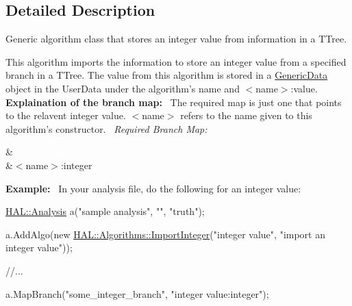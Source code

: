 \subsection{Detailed Description}
Generic algorithm class that stores an integer value from information in a T\+Tree. 

This algorithm imports the information to store an integer value from a specified branch in a T\+Tree. The value from this algorithm is stored in a \hyperlink{class_h_a_l_1_1_generic_data}{Generic\+Data} object in the User\+Data under the algorithm's name and $<$name$>$\+:value.~\newline
~\newline
{\bfseries Explaination of the branch map\+:}~\newline
The required map is just one that points to the relavent integer value. $<$name$>$ refers to the name given to this algorithm's constructor.~\newline
{\itshape Required Branch Map\+:} \begin{TabularC}{2}
\hline
{}&\PBS{}\\
&\PBS\centering $<$name$>$\+:integer \\
\end{TabularC}
{\bfseries Example\+:}~\newline
In your analysis file, do the following for an integer value\+:


\begin{DoxyCode}
\hyperlink{class_h_a_l_1_1_analysis}{HAL::Analysis} a(\textcolor{stringliteral}{"sample analysis"}, \textcolor{stringliteral}{""}, \textcolor{stringliteral}{"truth"});

a.AddAlgo(\textcolor{keyword}{new} \hyperlink{class_h_a_l_1_1_algorithms_1_1_import_integer}{HAL::Algorithms::ImportInteger}(\textcolor{stringliteral}{"integer value"}, \textcolor{stringliteral}{"import an
       integer value"}));

\textcolor{comment}{//...}

a.MapBranch(\textcolor{stringliteral}{"some\_integer\_branch"}, \textcolor{stringliteral}{"integer value:integer"});
\end{DoxyCode}
 

